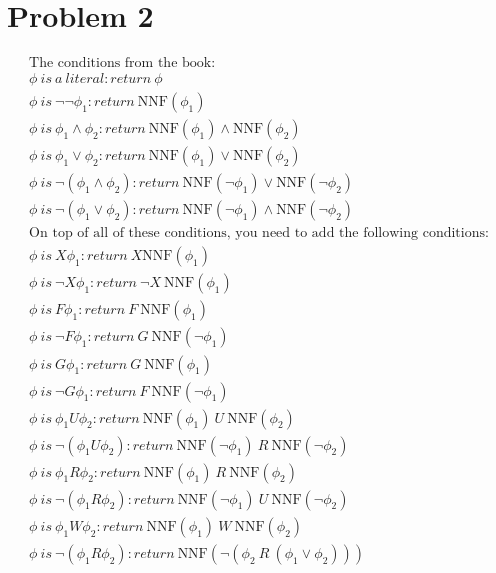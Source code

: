 \documentclass{article}
\begin{document}
\section{Problem 2}
\begin{align*}
	\text{The conditions from the book:}\\
	\phi\ is\ a\ literal: return\ \phi \\
	\phi\ is\ \neg \neg \phi_1: return\ \text{NNF}(\phi_1)\\
	\phi\ is\ \phi_1 \land \phi_2: return\ \text{NNF}(\phi_1) \land \text{NNF}(\phi_2)\\
	\phi\ is\ \phi_1 \lor \phi_2: return\ \text{NNF}(\phi_1) \lor \text{NNF}(\phi_2)\\
	\phi\ is\ \neg(\phi_1 \land \phi_2): return\ \text{NNF}(\neg \phi_1) \lor \text{NNF}(\neg \phi_2)\\
	\phi\ is\ \neg(\phi_1 \lor \phi_2): return\ \text{NNF}(\neg \phi_1) \land \text{NNF}(\neg\phi_2)\\
	\text{On top of all of these conditions, you need to add the following conditions:}\\
	\phi\ is\ X\phi_1: return\ X \text{NNF}(\phi_1)\\
	\phi\ is\ \neg X\phi_1: return\ \neg X\ \text{NNF}(\phi_1)\\
	\phi\ is\ F\phi_1: return\ F\ \text{NNF}(\phi_1)\\
	\phi\ is\ \neg F\phi_1: return\ G\ \text{NNF}(\neg \phi_1)\\
	\phi\ is\ G\phi_1: return\ G\ \text{NNF}(\phi_1)\\
	\phi\ is\ \neg G\phi_1: return\ F\ \text{NNF}(\neg \phi_1)\\
	\phi\ is\ \phi_1 U \phi_2: return\ \text{NNF}(\phi_1)\ U\ \text{NNF}(\phi_2)\\
	\phi\ is\ \neg(\phi_1 U \phi_2): return\ \text{NNF}(\neg \phi_1)\ R\ \text{NNF}(\neg \phi_2)\\
	\phi\ is\ \phi_1 R \phi_2: return\ \text{NNF}(\phi_1)\ R\ \text{NNF}(\phi_2)\\
	\phi\ is\ \neg(\phi_1 R \phi_2): return\ \text{NNF}(\neg \phi_1)\ U\ \text{NNF}(\neg \phi_2)\\
	\phi\ is\ \phi_1 W \phi_2: return\ \text{NNF}(\phi_1)\ W\ \text{NNF}(\phi_2)\\
	\phi\ is\ \neg(\phi_1 R \phi_2): return\ \text{NNF}(\neg(\phi_2\ R\ (\phi_1 \lor \phi_2)))\\
\end{align*}
\end{document}
